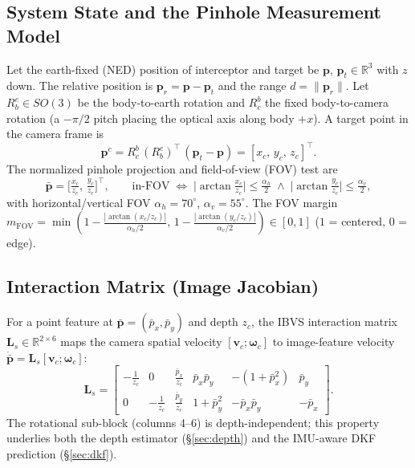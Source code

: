 \documentclass[11pt]{article}
\begin{document}
\subsection{System State and the Pinhole Measurement Model}
\label{sec:state}
Let the earth-fixed (NED) position of interceptor and target be
$\mathbf p,\,\mathbf p_t\in\mathbb R^3$ with $z$ down. The relative position
is $\mathbf p_r=\mathbf p-\mathbf p_t$ and the range $d=\lVert\mathbf p_r\rVert$.
Let $R_b^e\in SO(3)$ be the body-to-earth rotation and $R_c^b$ the fixed
body-to-camera rotation (a $-\pi/2$ pitch placing the optical axis along body
$+x$). A target point in the camera frame is
\begin{equation}
\mathbf p^c = R_c^b\,(R_b^e)^\top\,(\mathbf p_t-\mathbf p)
= [x_c,\,y_c,\,z_c]^\top .
\end{equation}
The normalized pinhole projection and field-of-view (FOV) test are
\begin{equation}
\bar{\mathbf p}=\Big[\tfrac{x_c}{z_c},\,\tfrac{y_c}{z_c}\Big]^\top,
\qquad
\text{in-FOV}\;\Leftrightarrow\;
\Big|\arctan\tfrac{x_c}{z_c}\Big|\le\tfrac{\alpha_h}{2}\;\wedge\;
\Big|\arctan\tfrac{y_c}{z_c}\Big|\le\tfrac{\alpha_v}{2},
\label{eq:fov}
\end{equation}
with horizontal/vertical FOV $\alpha_h=70^\circ$, $\alpha_v=55^\circ$. The
FOV margin $m_\text{FOV}=\min(1-\tfrac{|\arctan(x_c/z_c)|}{\alpha_h/2},\,
1-\tfrac{|\arctan(y_c/z_c)|}{\alpha_v/2})\in[0,1]$ ($1$ = centered, $0$ = edge).

\subsection{Interaction Matrix (Image Jacobian)}
For a point feature at $\bar{\mathbf p}=(\bar p_x,\bar p_y)$ and depth $z_c$,
the IBVS interaction matrix $\mathbf L_s\in\mathbb R^{2\times6}$ maps the
camera spatial velocity $[\mathbf v_c;\bm\omega_c]$ to image-feature velocity
$\dot{\bar{\mathbf p}}=\mathbf L_s[\mathbf v_c;\bm\omega_c]$:
\begin{equation}
\mathbf L_s=\begin{bmatrix}
-\tfrac{1}{z_c} & 0 & \tfrac{\bar p_x}{z_c} & \bar p_x\bar p_y & -(1+\bar p_x^2) & \bar p_y\\[2pt]
0 & -\tfrac{1}{z_c} & \tfrac{\bar p_y}{z_c} & 1+\bar p_y^2 & -\bar p_x\bar p_y & -\bar p_x
\end{bmatrix}.
\label{eq:Ls}
\end{equation}
The rotational sub-block (columns 4--6) is depth-independent; this property
underlies both the depth estimator (\S\ref{sec:depth}) and the IMU-aware DKF
prediction (\S\ref{sec:dkf}).
\end{document}
